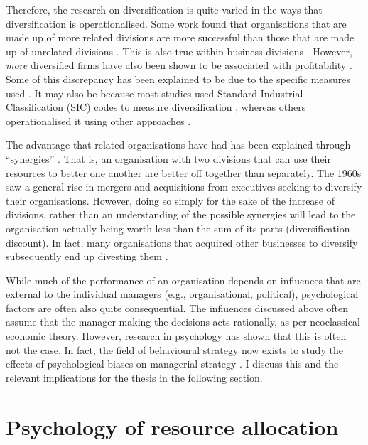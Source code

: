\documentclass[a4paper, nobind, dvipsnames]{templates/ociamthesis}
\theoremstyle{definition}
\theoremstyle{definition}
\theoremstyle{definition}
\theoremstyle{definition}
\theoremstyle{remark}
\begin{document}
Therefore, the research on diversification is quite varied in the ways that
diversification is operationalised. Some work found that organisations that are
made up of more related divisions are more successful than those that are made
up of unrelated divisions \autocite{harrison1993,rumelt1974,shelton1988,wernerfelt1988}. This is also true within business divisions \autocite{davis1992}.
However, \emph{more} diversified firms have also been shown to be associated with
profitability \autocite{grant1988}. Some of this discrepancy has been explained to be
due to the specific measures used \autocite{lubatkin1986}. It may also be because most
studies used Standard Industrial Classification (SIC) codes to measure
diversification \autocite[e.g.,][]{rumelt1974}, whereas others operationalised it using
other approaches \autocite[e.g., resource-based;][]{harrison1993}.

The advantage that related organisations have had has been explained through
``synergies'' \autocite{barney1988}. That is, an organisation with two divisions that can
use their resources to better one another are better off together than
separately. The 1960s saw a general rise in mergers and acquisitions from
executives seeking to diversify their organisations. However, doing so simply
for the sake of the increase of divisions, rather than an understanding of the
possible synergies will lead to the organisation actually being worth less than
the sum of its parts (diversification discount). In fact, many organisations
that acquired other businesses to diversify subsequently end up divesting them
\autocite{porter1987}.

While much of the performance of an organisation depends on influences that are
external to the individual managers (e.g., organisational, political),
psychological factors are often also quite consequential. The influences
discussed above often assume that the manager making the decisions acts
rationally, as per neoclassical economic theory. However, research in psychology
has shown that this is often not the case. In fact, the field of behavioural
strategy now exists to study the effects of psychological biases on managerial
strategy \autocite{powell2011}. I discuss this and the relevant implications for the
thesis in the following section.

\section{Psychology of resource allocation}
\end{document}
